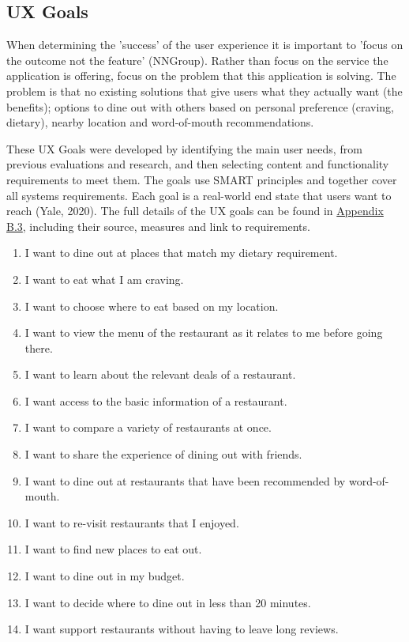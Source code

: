 \documentclass[a4 paper, 12pt]{article}
\begin{document}
    \subsection{UX Goals}
    When determining the 'success' of the user experience it is important to 'focus on the outcome not the feature' (NNGroup). Rather than focus on the service the application is offering, focus on the problem that this application is solving. The problem is that no existing solutions that give users what they actually want (the benefits); options to dine out with others based on personal preference (craving, dietary), nearby location and word-of-mouth recommendations.

    These UX Goals were developed by identifying the main user needs, from previous evaluations and research, and then selecting content and functionality requirements to meet them. The goals use SMART principles and together cover all systems requirements. Each goal is a real-world end state that users want to reach (Yale, 2020). The full details of the UX goals can be found in \hyperref[sec:B.3]{Appendix B.3}, including their source, measures and link to requirements.
        \begin{enumerate}
            \item I want to dine out at places that match my dietary requirement.
            \item I want to eat what I am craving.
            \item I want to choose where to eat based on my location.
            \item I want to view the menu of the restaurant as it relates to me before going there.
            \item I want to learn about the relevant deals of a restaurant.
            \item I want access to the basic information of a restaurant.
            \item I want to compare a variety of restaurants at once.
            \item I want to share the experience of dining out with friends.
            \item I want to dine out at restaurants that have been recommended by word-of-mouth.
            \item I want to re-visit restaurants that I enjoyed.
            \item I want to find new places to eat out.
            \item I want to dine out in my budget.
            \item I want to decide where to dine out in less than 20 minutes.
            \item I want support restaurants without having to leave long reviews.
        \end{enumerate}
\end{document}
